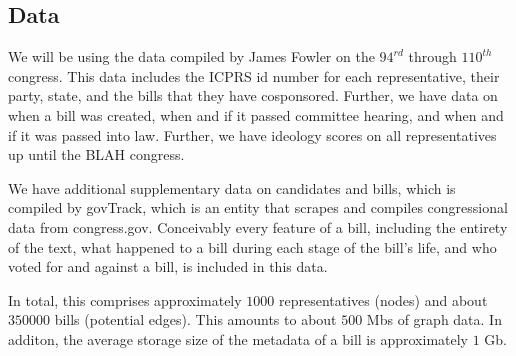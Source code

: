 \subsection{Data}

We will be using the data compiled by James Fowler on the $94^{rd}$ through 
$110^{th}$ congress. This data includes the ICPRS id number for each 
representative, their party, state, and the bills that they have cosponsored. 
Further, we have data on when a bill was created, when and if it passed 
committee hearing, and when and if it was passed into law. Further, we have 
ideology scores on all representatives up until the BLAH congress.

We have additional supplementary data on candidates and bills, which is compiled 
by govTrack, which is an entity that scrapes and compiles congressional data 
from congress.gov. Conceivably every feature of a bill, including the 
entirety of the text, what happened to a bill during each stage of the 
bill's life, and who voted for and against a bill, is included in this data. 

In total, this comprises approximately $1000$ representatives (nodes) and about 
$350000$ bills (potential edges). This amounts to about $500$ Mbs of graph 
data. In additon, the average storage size of the metadata of a bill is 
approximately $1$ Gb.
